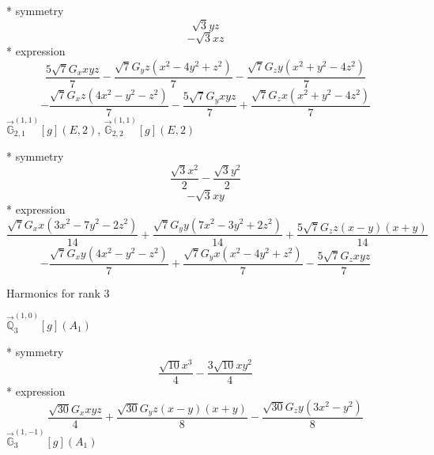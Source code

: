 \documentclass[fleqn,8pt]{jsarticle}
\begin{document}
\noindent\quad ** symmetry
\begin{dmath*}
\sqrt{3} y z
\end{dmath*}
\begin{dmath*}
- \sqrt{3} x z
\end{dmath*}
\noindent\quad ** expression
\begin{dmath*}
\frac{5 \sqrt{7} G_{x} x y z}{7} - \frac{\sqrt{7} G_{y} z \left(x^{2} - 4 y^{2} + z^{2}\right)}{7} - \frac{\sqrt{7} G_{z} y \left(x^{2} + y^{2} - 4 z^{2}\right)}{7}
\end{dmath*}
\begin{dmath*}
- \frac{\sqrt{7} G_{x} z \left(4 x^{2} - y^{2} - z^{2}\right)}{7} - \frac{5 \sqrt{7} G_{y} x y z}{7} + \frac{\sqrt{7} G_{z} x \left(x^{2} + y^{2} - 4 z^{2}\right)}{7}
\end{dmath*}
\noindent\quad $\vec{\mathbb{G}}_{2,1}^{(1,1)}[g](E,2)$, $\vec{\mathbb{G}}_{2,2}^{(1,1)}[g](E,2)$

\noindent\quad ** symmetry
\begin{dmath*}
\frac{\sqrt{3} x^{2}}{2} - \frac{\sqrt{3} y^{2}}{2}
\end{dmath*}
\begin{dmath*}
- \sqrt{3} x y
\end{dmath*}
\noindent\quad ** expression
\begin{dmath*}
\frac{\sqrt{7} G_{x} x \left(3 x^{2} - 7 y^{2} - 2 z^{2}\right)}{14} + \frac{\sqrt{7} G_{y} y \left(7 x^{2} - 3 y^{2} + 2 z^{2}\right)}{14} + \frac{5 \sqrt{7} G_{z} z \left(x - y\right) \left(x + y\right)}{14}
\end{dmath*}
\begin{dmath*}
- \frac{\sqrt{7} G_{x} y \left(4 x^{2} - y^{2} - z^{2}\right)}{7} + \frac{\sqrt{7} G_{y} x \left(x^{2} - 4 y^{2} + z^{2}\right)}{7} - \frac{5 \sqrt{7} G_{z} x y z}{7}
\end{dmath*}

\noindent * Harmonics for rank 3

\noindent\quad $\vec{\mathbb{Q}}_{3}^{(1,0)}[g](A_{1})$

\noindent\quad ** symmetry
\begin{dmath*}
\frac{\sqrt{10} x^{3}}{4} - \frac{3 \sqrt{10} x y^{2}}{4}
\end{dmath*}
\noindent\quad ** expression
\begin{dmath*}
\frac{\sqrt{30} G_{x} x y z}{4} + \frac{\sqrt{30} G_{y} z \left(x - y\right) \left(x + y\right)}{8} - \frac{\sqrt{30} G_{z} y \left(3 x^{2} - y^{2}\right)}{8}
\end{dmath*}
\noindent\quad $\vec{\mathbb{G}}_{3}^{(1,-1)}[g](A_{1})$
\end{document}

